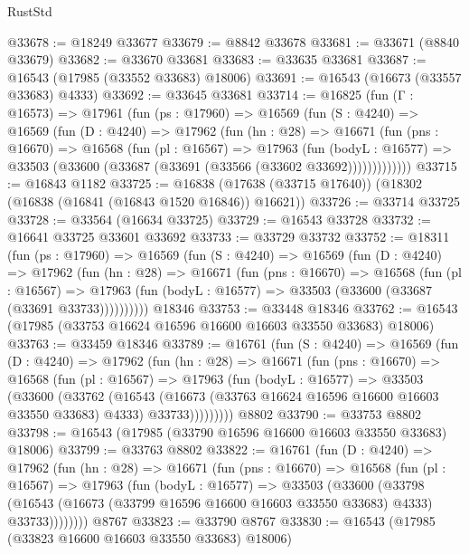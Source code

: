 \begin{lexlean}{RustStd}
\begin{coremodule}
@33678 := @18249 @33677
@33679 := @8842 @33678
@33681 := @33671 (@8840 @33679)
@33682 := @33670 @33681
@33683 := @33635 @33681
@33687 := @16543 (@17985 (@33552 @33683) @18006)
@33691 := @16543 (@16673 (@33557 @33683) @4333)
@33692 := @33645 @33681
@33714 := @16825
    (fun (Γ : @16573) =>
    @17961
      (fun (ps : @17960) =>
      @16569
        (fun (S : @4240) =>
        @16569
          (fun (D : @4240) =>
          @17962
            (fun (hn : @28) =>
            @16671
              (fun (pns : @16670) =>
              @16568
                (fun (pl : @16567) =>
                @17963
                  (fun (bodyL : @16577) =>
                  @33503 (@33600 (@33687 (@33691 (@33566 (@33602 @33692)))))))))))))
@33715 := @16843 @1182
@33725 := @16838 (@17638 (@33715 @17640)) (@18302 (@16838 (@16841 (@16843 @1520 @16846)) @16621))
@33726 := @33714 @33725
@33728 := @33564 (@16634 @33725)
@33729 := @16543 @33728
@33732 := @16641 @33725 @33601 @33692
@33733 := @33729 @33732
@33752 := @18311
    (fun (ps : @17960) =>
    @16569
      (fun (S : @4240) =>
      @16569
        (fun (D : @4240) =>
        @17962
          (fun (hn : @28) =>
          @16671
            (fun (pns : @16670) =>
            @16568
              (fun (pl : @16567) =>
              @17963 (fun (bodyL : @16577) => @33503 (@33600 (@33687 (@33691 @33733))))))))))
    @18346
@33753 := @33448 @18346
@33762 := @16543 (@17985 (@33753 @16624 @16596 @16600 @16603 @33550 @33683) @18006)
@33763 := @33459 @18346
@33789 := @16761
    (fun (S : @4240) =>
    @16569
      (fun (D : @4240) =>
      @17962
        (fun (hn : @28) =>
        @16671
          (fun (pns : @16670) =>
          @16568
            (fun (pl : @16567) =>
            @17963
              (fun (bodyL : @16577) =>
              @33503
                (@33600
                  (@33762
                    (@16543
                      (@16673 (@33763 @16624 @16596 @16600 @16603 @33550 @33683) @4333)
                      @33733)))))))))
    @8802
@33790 := @33753 @8802
@33798 := @16543 (@17985 (@33790 @16596 @16600 @16603 @33550 @33683) @18006)
@33799 := @33763 @8802
@33822 := @16761
    (fun (D : @4240) =>
    @17962
      (fun (hn : @28) =>
      @16671
        (fun (pns : @16670) =>
        @16568
          (fun (pl : @16567) =>
          @17963
            (fun (bodyL : @16577) =>
            @33503
              (@33600
                (@33798
                  (@16543 (@16673 (@33799 @16596 @16600 @16603 @33550 @33683) @4333) @33733))))))))
    @8767
@33823 := @33790 @8767
@33830 := @16543 (@17985 (@33823 @16600 @16603 @33550 @33683) @18006)

\end{coremodule}
\end{lexlean}
